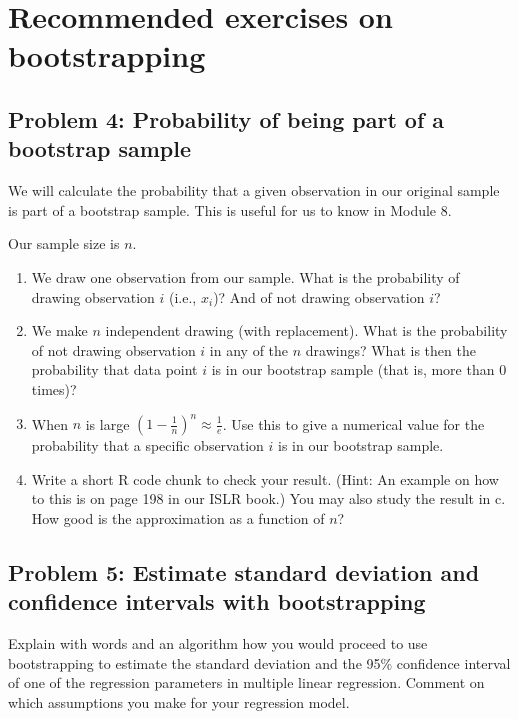\documentclass[]{article}
\providecommand{\tightlist}{%
  \setlength{\itemsep}{0pt}\setlength{\parskip}{0pt}}
\begin{document}
\section{Recommended exercises on
bootstrapping}\label{recommended-exercises-on-bootstrapping}

\subsection{Problem 4: Probability of being part of a bootstrap
sample}\label{problem-4-probability-of-being-part-of-a-bootstrap-sample}

We will calculate the probability that a given observation in our
original sample is part of a bootstrap sample. This is useful for us to
know in Module 8.

Our sample size is \(n\).

\begin{enumerate}
\def\labelenumi{\alph{enumi}.}
\tightlist
\item
  We draw one observation from our sample. What is the probability of
  drawing observation \(i\) (i.e., \(x_i\))? And of not drawing
  observation \(i\)?
\item
  We make \(n\) independent drawing (with replacement). What is the
  probability of not drawing observation \(i\) in any of the \(n\)
  drawings? What is then the probability that data point \(i\) is in our
  bootstrap sample (that is, more than 0 times)?
\item
  When \(n\) is large \((1-\frac{1}{n})^n \approx \frac{1}{e}\). Use
  this to give a numerical value for the probability that a specific
  observation \(i\) is in our bootstrap sample.
\item
  Write a short R code chunk to check your result. (Hint: An example on
  how to this is on page 198 in our ISLR book.) You may also study the
  result in c. How good is the approximation as a function of \(n\)?
\end{enumerate}

\subsection{Problem 5: Estimate standard deviation and confidence
intervals with
bootstrapping}\label{problem-5-estimate-standard-deviation-and-confidence-intervals-with-bootstrapping}

Explain with words and an algorithm how you would proceed to use
bootstrapping to estimate the standard deviation and the 95\% confidence
interval of one of the regression parameters in multiple linear
regression. Comment on which assumptions you make for your regression
model.
\end{document}

